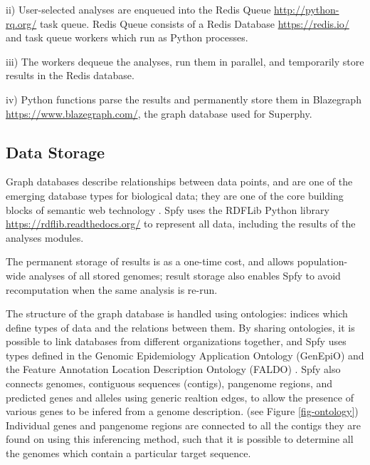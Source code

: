 \documentclass[a4,center,fleqn]{NAR}
\begin{document}
ii) User-selected analyses are enqueued into the Redis Queue \url{http://python-rq.org/} task queue. Redis Queue consists of a Redis Database \url{https://redis.io/} and task queue workers which run as Python processes.

iii) The workers dequeue the analyses, run them in parallel, and temporarily store results in the Redis database.

iv) Python functions parse the results and permanently store them in Blazegraph \url{https://www.blazegraph.com/}, the graph database used for Superphy.

\subsection{Data Storage}
Graph databases describe relationships between data points, and are one of the emerging \cite{de2015trends} database types for biological data; they are one of the core building blocks of semantic web technology \cite{horrocks2005semantic}.
Spfy uses the RDFLib Python library \url{https://rdflib.readthedocs.org/} to represent all data, including the results of the analyses modules.

The permanent storage of results is as a one-time cost, and allows population-wide analyses of all stored genomes; result storage also enables Spfy to avoid recomputation when the same analysis is re-run.

The structure of the graph database is handled using ontologies: indices which define types of data and the relations between them.
By sharing ontologies, it is possible to link databases from different organizations together, and Spfy uses types defined in the  Genomic Epidemiology Application Ontology (GenEpiO) \cite{griffiths2017context} and the Feature Annotation Location Description Ontology (FALDO) \cite{bolleman2016faldo}.
Spfy also connects genomes, contiguous sequences (contigs), pangenome regions, and predicted genes and alleles using generic realtion edges, to allow the presence of various genes to be infered from a genome description.
(see Figure \ref{fig-ontology})
Individual genes and pangenome regions are connected to all the contigs they are found on using this inferencing method, such that it is possible to determine all the genomes which contain a particular target sequence.
\end{document}
